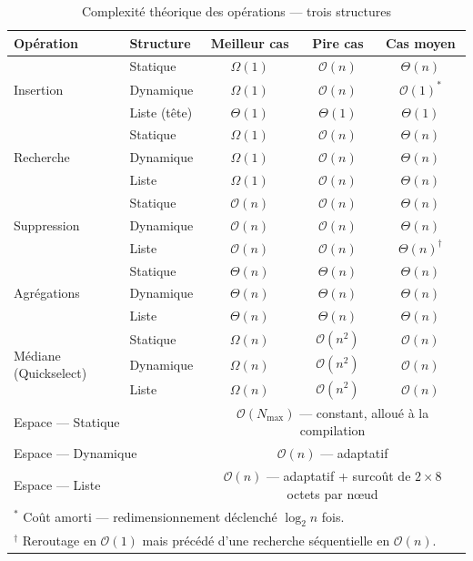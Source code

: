 \documentclass[12pt,a4paper]{report}
\begin{document}
\begin{table}[H]
\centering
\caption{Complexité théorique des opérations — trois structures}
\label{tab:complexite}
\renewcommand{\arraystretch}{1.3}
\begin{tabular}{llccc}
\toprule
\textbf{Opération} & \textbf{Structure} & \textbf{Meilleur cas} & \textbf{Pire cas} & \textbf{Cas moyen} \\
\midrule
\multirow{3}{*}{Insertion}
  & Statique   & $\Omega(1)$ & $\mathcal{O}(n)$ & $\Theta(n)$ \\
  & Dynamique  & $\Omega(1)$ & $\mathcal{O}(n)$ & $\mathcal{O}(1)^*$ \\
  & Liste (tête) & $\Theta(1)$ & $\Theta(1)$ & $\Theta(1)$ \\
\midrule
\multirow{3}{*}{Recherche}
  & Statique   & $\Omega(1)$ & $\mathcal{O}(n)$ & $\Theta(n)$ \\
  & Dynamique  & $\Omega(1)$ & $\mathcal{O}(n)$ & $\Theta(n)$ \\
  & Liste      & $\Omega(1)$ & $\mathcal{O}(n)$ & $\Theta(n)$ \\
\midrule
\multirow{3}{*}{Suppression}
  & Statique   & $\mathcal{O}(n)$ & $\mathcal{O}(n)$ & $\Theta(n)$ \\
  & Dynamique  & $\mathcal{O}(n)$ & $\mathcal{O}(n)$ & $\Theta(n)$ \\
  & Liste      & $\mathcal{O}(n)$ & $\mathcal{O}(n)$ & $\Theta(n)^{\dagger}$ \\
\midrule
\multirow{3}{*}{Agrégations}
  & Statique   & $\Theta(n)$ & $\Theta(n)$ & $\Theta(n)$ \\
  & Dynamique  & $\Theta(n)$ & $\Theta(n)$ & $\Theta(n)$ \\
  & Liste      & $\Theta(n)$ & $\Theta(n)$ & $\Theta(n)$ \\
\midrule
\multirow{3}{*}{Médiane (Quickselect)}
  & Statique   & $\Omega(n)$ & $\mathcal{O}(n^2)$ & $\mathcal{O}(n)$ \\
  & Dynamique  & $\Omega(n)$ & $\mathcal{O}(n^2)$ & $\mathcal{O}(n)$ \\
  & Liste      & $\Omega(n)$ & $\mathcal{O}(n^2)$ & $\mathcal{O}(n)$ \\
\midrule
\multicolumn{2}{l}{Espace — Statique}   & \multicolumn{3}{c}{$\mathcal{O}(N_{\max})$ — constant, alloué à la compilation} \\
\multicolumn{2}{l}{Espace — Dynamique}  & \multicolumn{3}{c}{$\mathcal{O}(n)$ — adaptatif} \\
\multicolumn{2}{l}{Espace — Liste}      & \multicolumn{3}{c}{$\mathcal{O}(n)$ — adaptatif + surcoût de $2 \times 8$ octets par nœud} \\
\bottomrule
\multicolumn{5}{l}{\small $^*$ Coût amorti — redimensionnement déclenché $\log_2 n$ fois.} \\
\multicolumn{5}{l}{\small $^{\dagger}$ Reroutage en $\mathcal{O}(1)$ mais précédé d'une recherche séquentielle en $\mathcal{O}(n)$.}
\end{tabular}
\end{table}
\end{document}
